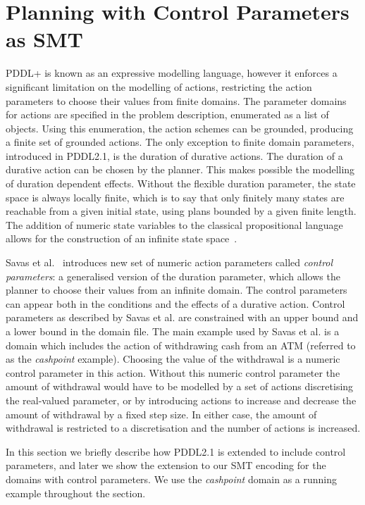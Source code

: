 \section{Planning with Control Parameters as SMT}\label{sec:control_parameters}

PDDL+ is known as an expressive modelling language, however it enforces a significant limitation on the modelling of actions, restricting the action parameters to choose their values from finite domains. The parameter domains for actions are specified in the problem description, enumerated as a list of objects. Using this enumeration, the action schemes can be grounded, producing a finite set of grounded actions.
%
The only exception to finite domain parameters, introduced in PDDL2.1, is the duration of durative actions. The duration of a durative action can be chosen by the planner. This makes possible the modelling of duration dependent effects. Without the flexible duration parameter, the state space is always locally finite, which is to say that only finitely many states are reachable from a given initial state, using plans bounded by a given finite length. The addition of numeric state variables to the classical propositional language allows for the construction of an infinite state space~\cite{savas2016planning}.

Savas et al.~\cite{savas2016planning} introduces new set of numeric action parameters called \textit{control parameters}: a generalised version of the duration parameter, which allows the planner to choose their values from an infinite domain. The control parameters can appear both in the conditions and the effects of a durative action. Control parameters as described by Savas et al. are constrained with an upper bound and a lower bound in the domain file. The main example used by Savas et al. is a domain which includes the action of withdrawing cash from an ATM (referred to as the \textit{cashpoint} example). Choosing the value of the withdrawal is a numeric control parameter in this action. Without this numeric control parameter the amount of withdrawal would have to be modelled by a set of actions discretising the real-valued parameter, or by introducing actions to increase and decrease the amount of withdrawal by a fixed step size. In either case, the amount of withdrawal is restricted to a discretisation and the number of actions is increased.

In this section we briefly describe how PDDL2.1 is extended to include control parameters, and later we show the extension to our SMT encoding for the domains with control parameters. We use the \textit{cashpoint} domain as a running example throughout the section.

